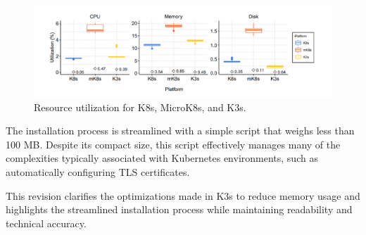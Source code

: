 \begin{figure}[ht]\centering
\includegraphics[scale=0.7]{Pictures/guido}
\caption{Resource utilization for K8s, MicroK8s, and K3s.}\label{fig:guido}
\end{figure}

The installation process is streamlined with a simple script that weighs less than 100 MB. Despite its compact size, this script effectively manages many of the complexities typically associated with Kubernetes environments, such as automatically configuring TLS certificates.

This revision clarifies the optimizations made in K3s to reduce memory usage and highlights the streamlined installation process while maintaining readability and technical accuracy.


